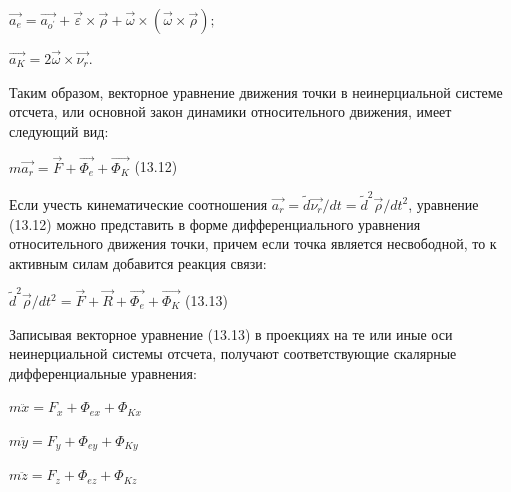 {\begin{center}
    \par $\vec{a_e} = \vec{a_{o^\prime}} + \vec{\varepsilon} \times \vec{\rho} + \vec{\omega} \times (\vec{\omega} \times \vec{\rho});$

    \par $\vec{a_K} = 2\vec{\omega} \times \vec{\nu_r}.$

    \par Таким образом, векторное уравнение движения точки в неинерциальной системе отсчета,  или основной закон  динамики относительного  движения, имеет следующий вид:

    \par $m\vec{a_r}=\vec{F}+\vec{\Phi_e}+\vec{\Phi_K}$ \qquad (13.12)

    \par Если учесть кинематические соотношения $\vec{a_r}=\tilde d\vec{\nu_r}/dt=\tilde d^2 \vec{\rho}/dt^2$, уравнение (13.12) можно представить в форме дифференциального уравнения относительного движения точки, причем если точка является несвободной, то к активным силам добавится реакция связи:

    \par $\tilde d^2 \vec{\rho}/dt^2 = \vec{F}+\vec{R}+\vec{\Phi_e}+\vec{\Phi_K}$ \qquad (13.13)

    \par Записывая векторное уравнение (13.13) в проекциях на те или иные оси неинерциальной системы отсчета, получают соответствующие скалярные дифференциальные уравнения:

    \par $m \ddot x=F_x+\Phi_{ex}+\Phi_{Kx}$
    \par $m \ddot y=F_y+\Phi_{ey}+\Phi_{Ky}$
    \par $m \ddot z=F_z+\Phi_{ez}+\Phi_{Kz}$
\end{center}
}
